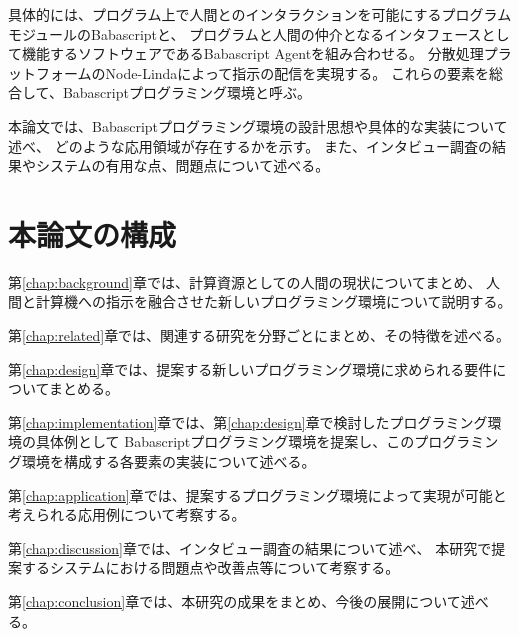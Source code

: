 具体的には、プログラム上で人間とのインタラクションを可能にするプログラムモジュールのBabascriptと、
プログラムと人間の仲介となるインタフェースとして機能するソフトウェアであるBabascript
Agentを組み合わせる。
分散処理プラットフォームのNode-Lindaによって指示の配信を実現する。
これらの要素を総合して、Babascriptプログラミング環境と呼ぶ。

本論文では、Babascriptプログラミング環境の設計思想や具体的な実装について述べ、
どのような応用領域が存在するかを示す。
また、インタビュー調査の結果やシステムの有用な点、問題点について述べる。

\section{本論文の構成}\label{ux672cux8ad6ux6587ux306eux69cbux6210}

第\ref{chap:background}章では、計算資源としての人間の現状についてまとめ、
人間と計算機への指示を融合させた新しいプログラミング環境について説明する。

第\ref{chap:related}章では、関連する研究を分野ごとにまとめ、その特徴を述べる。

第\ref{chap:design}章では、提案する新しいプログラミング環境に求められる要件についてまとめる。

第\ref{chap:implementation}章では、第\ref{chap:design}章で検討したプログラミング環境の具体例として
Babascriptプログラミング環境を提案し、このプログラミング環境を構成する各要素の実装について述べる。

第\ref{chap:application}章では、提案するプログラミング環境によって実現が可能と考えられる応用例について考察する。

第\ref{chap:discussion}章では、インタビュー調査の結果について述べ、
本研究で提案するシステムにおける問題点や改善点等について考察する。

第\ref{chap:conclusion}章では、本研究の成果をまとめ、今後の展開について述べる。
